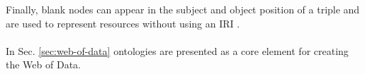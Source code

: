 Finally, blank nodes can appear in the subject and object position of a triple and are used to represent resources without using an \ac{IRI} \cite{world2014rdfprimer}.

\paragraph*{}
In Sec. \ref{sec:web-of-data} ontologies are presented as a core element for creating the Web of Data.





